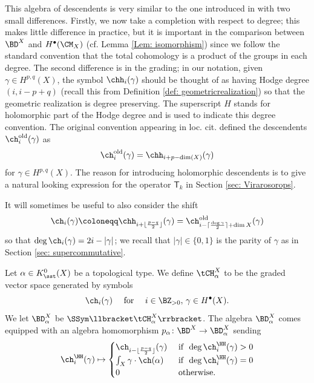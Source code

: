 \begin{remark}
\notready\label{rem: comparingnotation}
This algebra of descendents is very similar to the one introduced in \cite{moop} with two small differences. Firstly, we now take a completion with respect to degree; this makes little difference in practice, but it is important in the comparison between $\BD^X$ and $H^\bullet(\CM_X)$ (cf. Lemma \ref{Lem: isomorphism}) since we follow the standard convention that the total cohomology is a product of the groups in each degree. The second difference is in the grading; in our notation, given $\gamma\in H^{p,q}(X)$, the symbol $\chh_i(\gamma)$ should be thought of as having Hodge degree $(i, i-p+q)$ (recall this from Definition \ref{def: geometricrealization}) so that the geometric realization is degree preserving. The superscript $H$ stands for holomorphic part of the Hodge degree and is used to indicate this degree convention. The original convention appearing in loc. cit. defined the descendents $\ch^{\text{old}}_i(\gamma)$ as \[\ch_i^{\textup{old}}(\gamma)=\chh_{i+p-\dim(X)}(\gamma)\]
for $\gamma\in H^{p,q}(X)$. The reason for introducing holomorphic descendents is to give a natural looking expression for the operator $\mathsf{T}_k$ in Section \ref{sec: Virarosorops}.
\end{remark}

It will sometimes be useful to also consider the shift
\[\ch_{i}(\gamma)\coloneqq \chh_{i+\lfloor\frac{p-q}{2}\rfloor}(\gamma)=\ch^{\textup{old}}_{i-\lceil\frac{\deg \gamma}{2}\rceil+\dim X}(\gamma)\]
so that $\deg\ch_i(\gamma)=2i-|\gamma|$; we recall that $|\gamma|\in \{0,1\}$ is the parity of $\gamma$ as in Section \ref{sec: supercommutative}.
\begin{definition}
\notready\label{def: topdescendentalgebra}
Let $\alpha\in K_\sst^0(X)$ be a topological type. We define $\tCH^X_\alpha$ to be the graded vector space generated by symbols \[\ch_i(\gamma)\quad\textup{ for }\quad i\in \BZ_{>0},\,\gamma\in H^\bullet(X).\]
We let $\BD^X_\alpha$ be $\SSym\llbracket \tCH^X_\alpha\rrbracket$. The algebra $\BD^X_\alpha$ comes equipped with an algebra homomorphism
$p_\alpha\colon \BD^X\to \BD^X_\alpha$
sending
\[\ch_i^\HH(\gamma)\mapsto\begin{cases}
\ch_{i-\lfloor\frac{p-q}{2}\rfloor}(\gamma) &\textup{ if } \,\deg\ch_i^\HH(\gamma)>0\\
\int_X \gamma\cdot \ch(\alpha) &\textup{ if } \,\deg\ch_i^\HH(\gamma)=0\\
0&\textup{ otherwise.}
\end{cases}\]
\end{definition}

